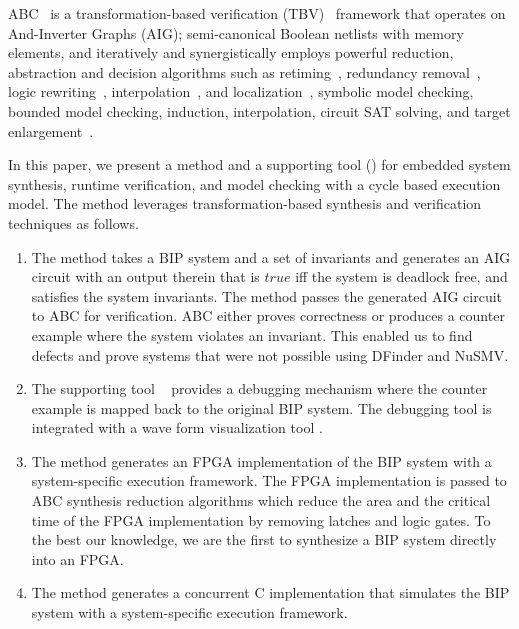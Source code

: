ABC~\cite{brayton2010abc} is a transformation-based 
verification (TBV)~\cite{kuehlmann2001transformation} framework that operates on 
And-Inverter Graphs (AIG); semi-canonical Boolean netlists with
memory elements, and iteratively and synergistically 
employs powerful reduction, abstraction and decision algorithms such as 
retiming~\cite{KuBa01}, 
redundancy removal~\cite{HmBPK05,KuMP01,BjesseC00,aziz-fmsd-00}, 
logic rewriting~\cite{BjBo04}, interpolation~\cite{McMillan03}, 
and localization~\cite{Wang03}, 
symbolic model checking, bounded model checking, induction, 
interpolation, circuit SAT solving, 
and target enlargement~\cite{MoGS00,MoMZ01,HoSH00,BaKuAb02,Hari05expert}.

In this paper, we present a method and a supporting tool (\biptool)
for embedded system synthesis, runtime verification,
and model checking with a cycle based execution model.
The method leverages transformation-based synthesis and verification techniques 
as follows. 

\begin{enumerate}
\item The method takes a BIP system and a set of invariants and generates 
  an AIG circuit with an output therein that is $\mathit{true}$ iff the system 
  is deadlock free, and satisfies the system invariants. 
  The method passes the generated AIG circuit to ABC for verification. 
  ABC either proves correctness or produces a counter example where the 
  system violates an invariant. 
  This enabled us to find defects and prove systems that were not 
  possible using DFinder and NuSMV. 
\item  The supporting tool \biptool~ provides a debugging mechanism where the 
  counter example is mapped back to the original BIP system. 
  The debugging tool is integrated with a wave form visualization tool \cite{bybell2010gtkwave}.  
\item The method generates an FPGA implementation of the BIP system with a 
  system-specific execution framework. 
  The FPGA implementation is passed to ABC synthesis reduction algorithms 
  which reduce the area and the critical time of the FPGA implementation 
  by removing latches and logic gates. 
  To the best our knowledge, we are the first to synthesize a BIP system directly 
  into an FPGA. 
\item The method generates a concurrent C implementation that simulates the BIP 
  system with a system-specific execution framework. 
\end{enumerate}


